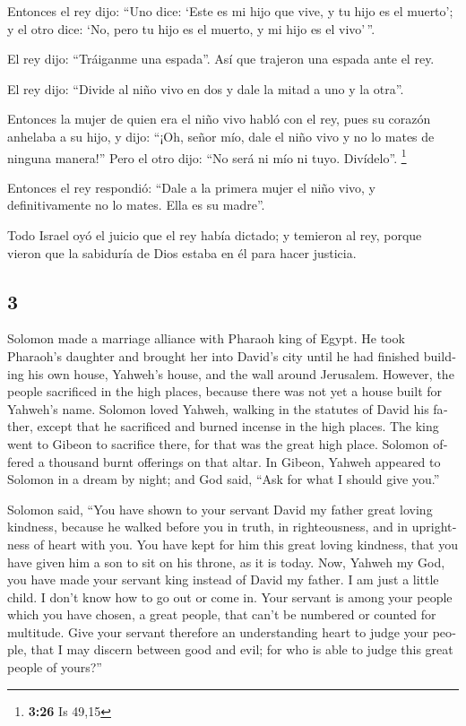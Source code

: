 \begin{paracol}{2}
 Entonces el rey dijo: ``Uno dice: `Este es mi hijo que
vive, y tu hijo es el muerto'; y el otro dice: `No, pero tu hijo es el
muerto, y mi hijo es el vivo'\,''.

 El rey dijo: ``Tráiganme una espada''. Así que trajeron
una espada ante el rey.

 El rey dijo: ``Divide al niño vivo en dos y dale la
mitad a uno y la otra''.

 Entonces la mujer de quien era el niño vivo habló con el
rey, pues su corazón anhelaba a su hijo, y dijo: ``¡Oh, señor mío, dale
el niño vivo y no lo mates de ninguna manera!'' Pero el otro dijo: ``No
será ni mío ni tuyo. Divídelo''. \footnote{\textbf{3:26} Is 49,15}

 Entonces el rey respondió: ``Dale a la primera mujer el
niño vivo, y definitivamente no lo mates. Ella es su madre''.

 Todo Israel oyó el juicio que el rey había dictado; y
temieron al rey, porque vieron que la sabiduría de Dios estaba en él
para hacer justicia.

\switchcolumn
\begin{otherlanguage}{english}

\hypertarget{section-5}{%
\section{3}\label{section-5}}

 Solomon made a marriage alliance with Pharaoh king of
Egypt. He took Pharaoh's daughter and brought her into David's city
until he had finished building his own house, Yahweh's house, and the
wall around Jerusalem.  However, the people sacrificed in
the high places, because there was not yet a house built for Yahweh's
name.  Solomon loved Yahweh, walking in the statutes of
David his father, except that he sacrificed and burned incense in the
high places.  The king went to Gibeon to sacrifice there,
for that was the great high place. Solomon offered a thousand burnt
offerings on that altar.  In Gibeon, Yahweh appeared to
Solomon in a dream by night; and God said, ``Ask for what I should give
you.''

 Solomon said, ``You have shown to your servant David my
father great loving kindness, because he walked before you in truth, in
righteousness, and in uprightness of heart with you. You have kept for
him this great loving kindness, that you have given him a son to sit on
his throne, as it is today.  Now, Yahweh my God, you have
made your servant king instead of David my father. I am just a little
child. I don't know how to go out or come in.  Your
servant is among your people which you have chosen, a great people, that
can't be numbered or counted for multitude.  Give your
servant therefore an understanding heart to judge your people, that I
may discern between good and evil; for who is able to judge this great
people of yours?''


\end{otherlanguage}
\end{paracol}
